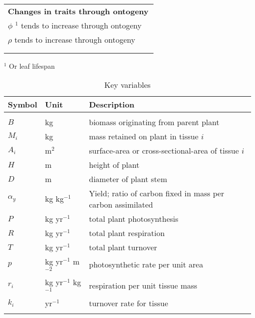 \documentclass[a4paper,11pt]{article}
\begin{document}
\begin{table}[ht]
{{\begin{tabular}{p{9cm}p{6cm}}
  \\ \multicolumn{2}{l}{\bf{Changes in traits through ontogeny}}\\
  $\phi$ $^1$ tends to increase through ontogeny & \\
  $\rho$ tends to increase through ontogeny & \citet{Osazuwa-2014}\\
  \\ \hline
  \\
  \end{tabular}
  }
$^1$ Or leaf lifespan
}
\label{tab:phenomena}
\end{table}

\newpage

\begin{table}[ht]
 \caption{Key variables}
\centering
{\footnotesize 
  \begin{tabular}{p{2cm}p{2cm}p{7cm}}
  \\
  \hline
  Symbol & Unit & Description \\
  \hline
\\
  $B$   & kg  & biomass originating from parent plant\\
  $M_i$ & kg  & mass retained on plant in tissue $i$\\
  $A_i$ & m$^2$  & surface-area or cross-sectional-area of tissue $i$\\
  $H$   & m  & height of plant\\
  $D$   & m  & diameter of plant stem\\
  $\alpha_y$ & kg kg$^{-1}$ & Yield; ratio of carbon fixed in mass per carbon assimilated \\
  $P$ & kg yr$^{-1}$ & total plant photosynthesis \\
  $R$ & kg yr$^{-1}$ & total plant respiration \\
  $T$ & kg yr$^{-1}$ & total plant turnover \\
  $p$ & kg yr$^{-1}$ m$^{-2}$  & photosynthetic rate per unit area \\
  $r_i$ & kg yr$^{-1}$ kg$^{-1}$  & respiration per unit tissue mass \\
  $k_i$ & yr$^{-1}$ & turnover rate for tissue \\
  \\\hline
  \end{tabular}
}
\label{tab:definitions}
\end{table}

\newpage
\end{document}
